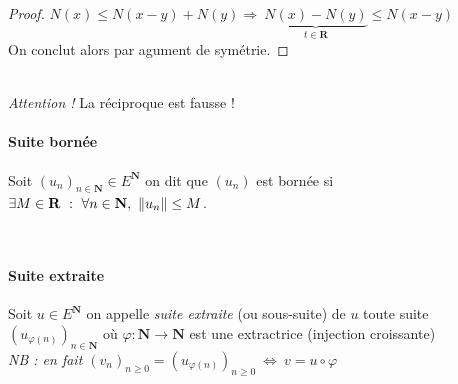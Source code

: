		 \medskip \\


		\begin{proof}
			$N(x)\leq N(x-y) + N(y) \Rightarrow ~ \underbrace{N(x) - N(y)}_{t\in \mathbf{R}} \leq N(x-y)$\\
			On conclut alors par agument de symétrie.
		\end{proof} \medskip

			
		 \medskip \\ {\small \emph{Attention !} La réciproque est fausse !}

		\vspace{-15pt}
		\traitd
		\paragraph{Suite bornée}
			Soit $\left(u_n\right)_{n\in\mathbf{N}} \in E^{\mathbf{N}}$ on dit que $\left(u_n\right)$ est bornée si
			$\exists M \in \mathbf{R} ~:~ \forall n\in\mathbf{N} ,~\left\Vert u_n \right\Vert\leq M$. 
		\trait

		 \medskip \\

		
		\traitd
		\paragraph{Suite extraite}
			Soit $u \in E^{\mathbf{N}}$ on appelle \emph{suite extraite} (ou sous-suite) de $u$ toute suite
			$\left(u_{\varphi (n)}\right)_{n\in \mathbf{N}}$ où $\varphi : \mathbf{N} \rightarrow \mathbf{N}$ 
			est une extractrice (injection croissante) \\ \textit{\small NB : en fait $\left(v_n\right)_{n\geq0} = 
			\left(u_{\varphi (n)} \right)_{n\geq 0} ~\Leftrightarrow ~v= u\circ\varphi$} 
		\trait

